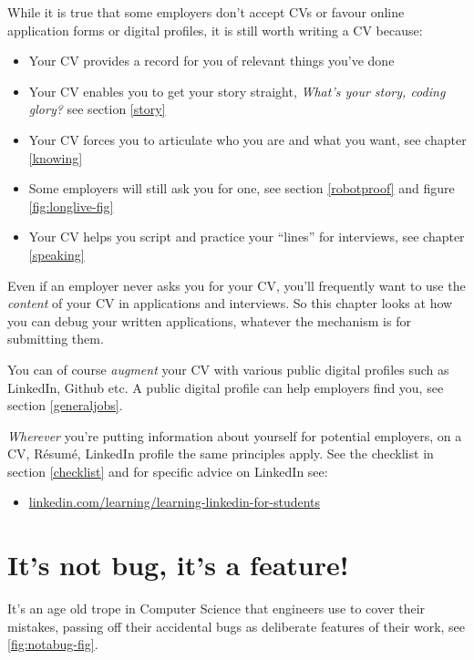 \documentclass[
]{book}
\providecommand{\tightlist}{%
  \setlength{\itemsep}{0pt}\setlength{\parskip}{0pt}}
\begin{document}
While it is true that some employers don't accept CVs or favour online application forms or digital profiles, it is still worth writing a CV because:

\begin{itemize}
\tightlist
\item
  Your CV provides a record for you of relevant things you've done
\item
  Your CV enables you to get your story straight, \emph{What's your story, coding glory?} see section \ref{story} \citep{whatsthestory}
\item
  Your CV forces you to articulate who you are and what you want, see chapter \ref{knowing}
\item
  Some employers will still ask you for one, see section \ref{robotproof} and figure \ref{fig:longlive-fig}
\item
  Your CV helps you script and practice your ``lines'' for interviews, see chapter \ref{speaking}
\end{itemize}

Even if an employer never asks you for your CV, you'll frequently want to use the \emph{content} of your CV in applications and interviews. So this chapter looks at how you can debug your written applications, whatever the mechanism is for submitting them.

You can of course \emph{augment} your CV with various public digital profiles such as LinkedIn, Github etc. A public digital profile can help employers find you, see section \ref{generaljobs}.

\emph{Wherever} you're putting information about yourself for potential employers, on a CV, Résumé, LinkedIn profile the same principles apply. See the checklist in section \ref{checklist} and for specific advice on LinkedIn see:

\begin{itemize}
\tightlist
\item
  \href{https://linkedin.com/learning/learning-linkedin-for-students}{linkedin.com/learning/learning-linkedin-for-students}
\end{itemize}

\hypertarget{trope}{%
\section{It's not bug, it's a feature!}\label{trope}}

It's an age old trope in Computer Science that engineers use to cover their mistakes, passing off their accidental bugs as deliberate features of their work, see \ref{fig:notabug-fig}.
\end{document}
